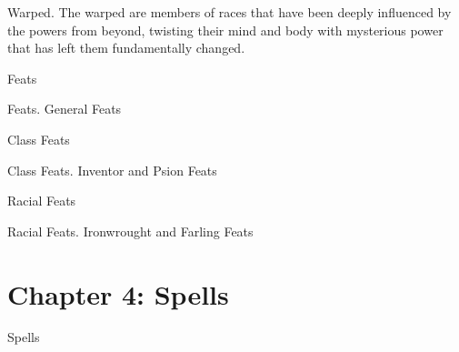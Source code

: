 \documentclass[11pt,twoside,openany]{book}  %
\begin{document}
\begin{fiveitemize}
\begin{fiveitemize}
			\item Warped. The warped are members of races that have been deeply influenced by the powers from beyond, twisting their mind and body with mysterious power that has left them fundamentally changed.
		\end{fiveitemize}
	\item Feats
		\begin{fiveitemize}
			\item Feats. General Feats
		\end{fiveitemize}
	\item Class Feats
		\begin{fiveitemize}
			\item Class Feats. Inventor and Psion Feats
		\end{fiveitemize}
	\item Racial Feats
		\begin{fiveitemize}
			\item Racial Feats. Ironwrought and Farling Feats
		\end{fiveitemize}
\end{fiveitemize}

\section*{Chapter 4: Spells}
\begin{fiveitemize}
	\item{Spells}
\end{fiveitemize}
\end{document}
